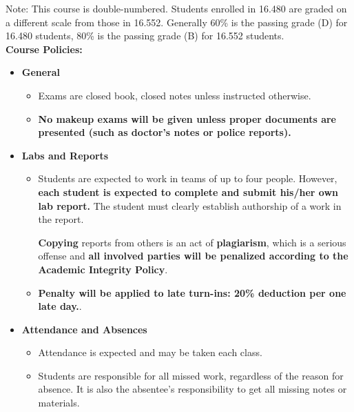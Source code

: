 \documentclass[11pt]{article}
\begin{document}
Note: This course is double-numbered. Students enrolled in 16.480 are graded on a different scale from those in 16.552. Generally 60\% is the passing grade (D) for 16.480 students, 80\% is the passing grade (B) for 16.552 students.
\\

\textbf {\large Course Policies:}
\begin{itemize}
	\item \textbf {General}
		\begin{itemize}
			\item Exams are closed book, closed notes unless instructed otherwise.
			\item \textbf {No makeup exams will be given unless proper documents are presented (such as doctor's notes or police reports).}
		\end{itemize}
	\item \textbf {Labs and Reports}
		\begin{itemize}
			\item Students are expected to work in teams of up to four people. However, {\bf each student is expected to complete and submit his/her own lab report.} The student must clearly establish authorship of a work in the report.

\textbf{Copying} reports from others is an act of \textbf{plagiarism}, which is a serious offense and \textbf{all involved parties will be penalized according to the Academic Integrity Policy}.
			\item \textbf{Penalty will be applied to late turn-ins: 20\% deduction per one late day.}.
		\end{itemize}
	\item \textbf{Attendance and Absences}
		\begin{itemize}
			\item Attendance is expected and may be taken each class. 

			\item Students are responsible for all missed work, regardless of the reason for absence. It is also the absentee's responsibility to get all missing notes or materials. 
		\end{itemize}
\end{itemize}
\end{document}
